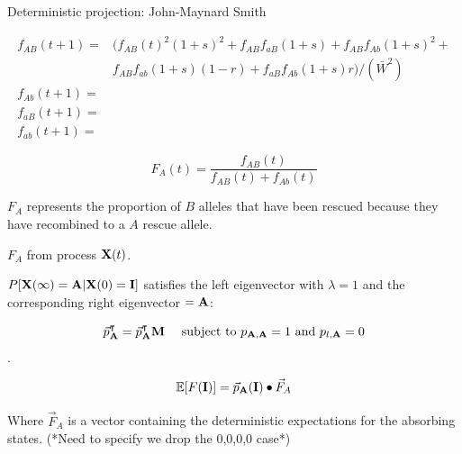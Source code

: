 \documentclass{beamer}
\begin{document}
\begin{frame}{Deterministic projection: John-Maynard Smith}


    \begin{equation*}
    \begin{aligned}
        f_{AB}(t+1)= &(f_{AB}(t)^2(1+s)^2+f_{AB}f_{aB}(1+s)+f_{AB}f_{Ab}(1+s)^2+ \\
        &f_{AB}f_{ab}(1+s)(1-r)+f_{aB}f_{Ab}(1+s)r)/(\bar{W}^2) \\
        f_{Ab}(t+1)=    \\
        f_{aB}(t+1)=    \\
        f_{ab}(t+1)=
        \end{aligned}
    \end{equation*}
    
\begin{equation*}
    F_A(t)= \frac{f_{AB}(t)}{f_{AB}(t)+f_{Ab}(t)}
\end{equation*}

$F_A$ represents the proportion of $B$ alleles that have been rescued because they have recombined to a $A$ rescue allele.

\end{frame}

\begin{frame}{$F_A$ from process $\bold{X}(t)$.}
    
    $P[\bold{X}(\infty) = \bold{A}| \bold{X}(0) = \bold{I}]$ satisfies the left eigenvector with $\lambda = 1$ and the corresponding right eigenvector $=\bold{A}$:
    
    \begin{equation*}
        \vec{p}_\bold{A}^\intercal = \vec{p}_\bold{A}^\intercal \bold{M} \ \ \ \  \text{subject to } p_{\bold{A},\bold{A}}=1 \ \text{and}\ p_{l,\bold{A}}=0
    \end{equation*}.
    
    \begin{equation*}
        \mathbb{E}[F(\bold{I})] = \vec{p}_\bold{A}(\bold{I}) \bullet \vec{F}_A   %
    \end{equation*}
    
    Where $\vec{F}_A$ is a vector containing the deterministic expectations for the absorbing states. (*Need to specify we drop the {0,0,0,0} case*)
\end{frame}
\end{document}
